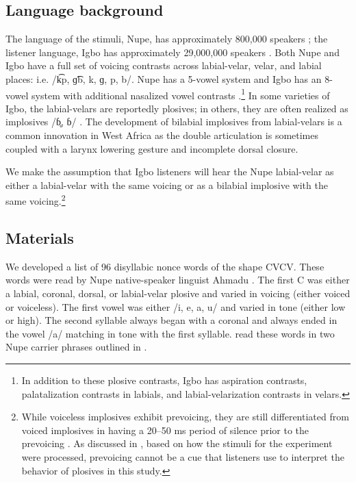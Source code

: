 \documentclass[output=paper,colorlinks,citecolor=brown
]{langscibook}
\begin{document}
\subsection{Language background}\label{sec:burnsshaw:LgBg}
The language of the stimuli, Nupe, has approximately 800,000 speakers \citep{EthnologueBurns}; the listener language, Igbo has approximately 29,000,000 speakers \citep{EthnologueBurns}. Both Nupe and Igbo have a full set of voicing contrasts across labial-velar, velar, and labial places: i.e.  /k͡p, ɡ͡b, k, ɡ, p, b/. Nupe has a 5-vowel system and Igbo has an 8-vowel system with additional nasalized vowel contrasts \citep{Ikekeonwu1991, Uguru2015, Phoible}.\footnote{In addition to these plosive contrasts, Igbo has aspiration contrasts, palatalization contrasts in labials, and labial-velarization contrasts in velars.} In some varieties of Igbo, the labial-velars are reportedly plosives; in others, they are often realized as implosives /ɓ̥, ɓ/ \citep{Phoible, Ukaegbu}. The development of bilabial implosives from labial-velars is a common innovation in West Africa \citep{Ladefoged1968, Ponelis1974} as the double articulation is sometimes coupled with a larynx lowering gesture and incomplete dorsal closure.

We make the assumption that Igbo listeners will hear the Nupe labial-velar as either a labial-velar with the same voicing or as a bilabial implosive with the same voicing.\footnote{While voiceless implosives exhibit prevoicing, they are still differentiated from voiced implosives in having a 20--50 ms period of silence prior to the prevoicing \citep[207--209]{McLaughlin2005}. As discussed in , based on how the stimuli for the experiment were processed, prevoicing cannot be a cue that listeners use to interpret the behavior of plosives in this study.}

\subsection{Materials}\label{sec:burnsshaw:Materials}
We developed a list of 96 disyllabic nonce words of the shape CVCV. These words were read by Nupe native-speaker linguist Ahmadu \citeauthor{Kawu}. The first C was either a labial, coronal, dorsal, or labial-velar plosive and varied in voicing (either voiced or voiceless). The first vowel was either /i, e, a, u/ and varied in tone (either low or high). The second syllable always began with a coronal and always ended in the vowel /a/ matching in tone with the first syllable. \citeauthor{Kawu} read these words in two Nupe carrier phrases outlined in .
\end{document}
